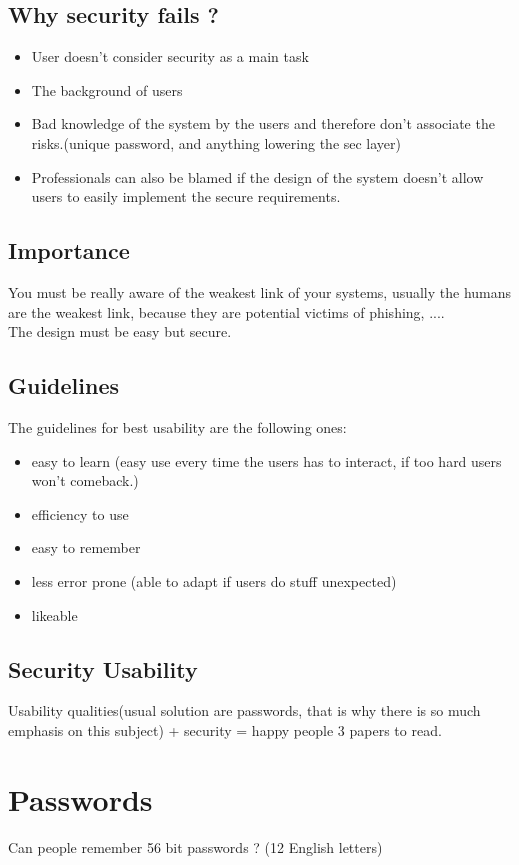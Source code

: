 \documentclass[10pt,a4paper]{article}
\begin{document}
\subsection{Why security fails ?}
\begin{itemize}
\item User doesn't consider security as a main task
\item The background of users 
\item Bad knowledge of the system by the users and therefore don't associate the risks.(unique password, and anything lowering the sec layer)
\item Professionals can also be blamed if the design of the system doesn't allow users to easily implement the secure requirements.
\end{itemize}
\subsection{Importance}
You must be really aware of the weakest link of your systems, usually the humans are the weakest link, because they are potential victims of phishing, ....\\
The design must be easy but secure.
\subsection{Guidelines}
The guidelines for best usability are the following ones:\\
\begin{itemize}
\item easy to learn (easy use every time the users has to interact, if too hard users won't comeback.)
\item efficiency to use
\item easy to remember 
\item less error prone (able to adapt if users do stuff unexpected)
\item likeable 
\end{itemize}
\subsection{Security Usability}
Usability qualities(usual solution are passwords, that is why there is so much emphasis on this subject) + security = happy people
3 papers to read.
\section{Passwords}
Can people remember 56 bit passwords ? (12 English letters)
\end{document}

